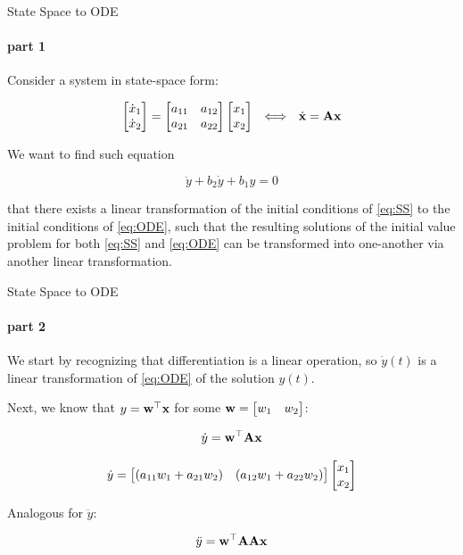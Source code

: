 \documentclass{beamer}
\begin{document}
\begin{frame}{State Space to ODE}
\framesubtitle{part 1}
\begin{flushleft}

Consider a system in state-space form:

\begin{equation}
\label{eq:SS}
\myvec{\dot x_1}{\dot x_2} = 
\ma{a_{11}}{a_{12}}{a_{21}}{a_{22}}
\myvec{x_1}{x_2} \ \ 
\Longleftrightarrow \ \ 
\dx{x} = \bo{A} \bo{x} 
\end{equation}

We want to find such equation 

\begin{equation}
\label{eq:ODE}
\ddot{y} + b_2 \dot{y} + b_1 y = 0
\end{equation}

that there exists a linear transformation of the initial conditions of \eqref{eq:SS} to the initial conditions of \eqref{eq:ODE}, such that the resulting solutions of the initial value problem for both \eqref{eq:SS} and \eqref{eq:ODE} can be transformed into one-another via another linear transformation.


\end{flushleft}
\end{frame}



\begin{frame}{State Space to ODE}
\framesubtitle{part 2}
\begin{flushleft}

We start by recognizing that differentiation is a linear operation, so $\dot{y}(t)$ is a linear transformation of \eqref{eq:ODE} of the solution $y(t)$. 

Next, we know that $y = \mathbf{w}^\top \mathbf{x}$ for some $\mathbf{w} = \begin{bmatrix} w_1 & w_2 \end{bmatrix}$:

\begin{equation}
\dot y = \mathbf{w}^\top \mathbf{A} \mathbf{x}
\end{equation}

\begin{equation}
\dot y = \begin{bmatrix} (a_{11}w_1 + a_{21}w_2) & (a_{12}w_1 + a_{22}w_2) \end{bmatrix}
\begin{bmatrix} x_1 \\ x_2 \end{bmatrix}    
\end{equation}

Analogous for $\ddot y$:

\begin{equation}
\ddot y = \mathbf{w}^\top \mathbf{A} \mathbf{A} \mathbf{x}
\end{equation}

\end{flushleft}
\end{frame}
\end{document}
